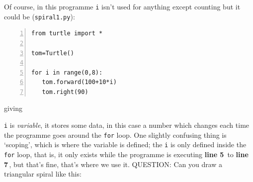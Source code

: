 \documentclass[11pt,a4paper]{scrartcl}
\newcommand{\lnn}[1]{\textbf{line #1}\,}
\begin{document}
Of course, in this programme \texttt{i} isn't used for anything except
counting but it could be (\texttt{spiral1.py}):
\begin{lstlisting}[numbers=left]
from turtle import *

tom=Turtle()

for i in range(0,8):
   tom.forward(100+10*i)
   tom.right(90)

\end{lstlisting}
giving
\begin{center}
\end{center}
\texttt{i} is \textsl{variable}, it stores some data, in this case a number
which changes each time the programme goes around the \texttt{for}
loop. One slightly confusing thing is \lq{}scoping\rq{}, which is
where the variable is defined; the \texttt{i} is only defined inside
the \texttt{for} loop, that is, it only exists while the programme is
executing \lnn{5} to \lnn{7}, but that's fine, that's where we use it.
QUESTION: Can you draw a triangular spiral like this:
\begin{center}
\end{center}
\end{document}
